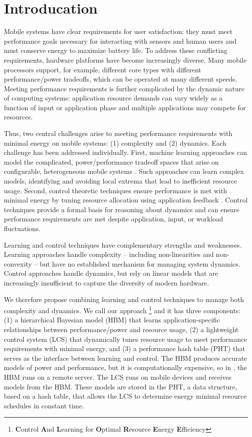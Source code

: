 \section{Introducation}
Mobile systems have clear requirements for user satisfaction: they
must meet performance goals necessary for interacting with sensors and
human users and must conserve energy to maximize battery life.  To
address these conflicting requirements, hardware platforms have become
increasingly diverse.  Many mobile processors support, for example,
different core types with different performance/power tradeoffs, which
can be operated at many different speeds.  Meeting performance
requirements is further complicated by the dynamic nature of computing
systems: application resource demands can vary widely as a function of
input or application phase and multiple applications may compete for
resources.

Thus, two central challenges arise to meeting performance requirements
with minimal energy on mobile systems: (1) complexity and (2)
dynamics.  Each challenge has been addressed individually.  First,
machine learning approaches can model the complicated,
power/performance tradeoff spaces that arise on configurable,
heterogeneous mobile systems
\cite{dubach2010,Bitirgen2008,Ipek,Koala,LEO,Flicker,Ponamarev}.  Such
approaches can learn complex models, identifying and avoiding local
extrema that lead to inefficient resource usage.  Second, control
theoretic techniques ensure performance is met with minimal energy by
tuning resource allocation using application feedback
\cite{Wu2004,Chen2011,PTRADE,POET,ControlWare,Agilos,grace2}.  Control
techniques provide a formal basis for reasoning about dynamics and can
ensure performance requirements are met despite application, input, or
workload fluctuations.

Learning and control techniques have complementary strengths and
weaknesses.  Learning approaches handle complexity -- including
non-linearities and non-convexity -- but have no established mechanism
for managing system dynamics.  Control approaches handle dynamics, but
rely on linear models that are increasingly insufficient to capture
the diversity of modern hardware.

We therefore propose combining learning and control techniques to
manage both complexity and dynamics.  We call our approach
\SYSTEM{}\footnote{\textbf{C}ontrol \textbf{A}nd \textbf{L}earning for
  \textbf{O}ptimal \textbf{R}esource \textbf{E}nergy
  \textbf{E}fficiency} and it has three components: (1) a hierarchical
Bayesian model (HBM) that learns application-specific relationships
between performance/power and resource usage, (2) a lightweight
control system (LCS) that dynamically tunes resource usage to meet
performance requirements with minimal energy, and (3) a performance
hash table (PHT) that serves as the interface between learning and
control.  The HBM produces accurate models of power and performance,
but it is computationally expensive, so in \SYSTEM{}, the HBM runs on
a remote server.  The LCS runs on mobile devices and receives models
from the HBM.  These models are stored in the PHT, a data structure,
based on a hash table, that allows the LCS to determine energy minimal
resource schedules in constant time.


